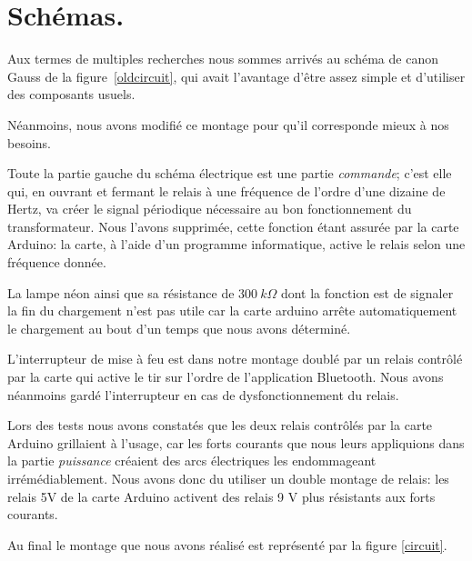\section{Schémas.}
Aux termes de multiples recherches nous sommes arrivés au
schéma de canon Gauss de la figure~\ref{oldcircuit}, qui avait l'avantage d'être assez
simple et d'utiliser des composants usuels.



Néanmoins, nous avons modifié ce montage pour qu'il corresponde
mieux à nos besoins.

Toute la partie gauche du schéma électrique est une partie
\emph{commande}; c'est elle qui, en ouvrant et fermant le
relais à une fréquence de l'ordre d'une dizaine de Hertz, va
créer le signal périodique nécessaire au bon fonctionnement du
transformateur. Nous l'avons supprimée, cette fonction étant
assurée par la carte Arduino: la carte, à l'aide d'un
programme informatique, active le relais selon une fréquence
donnée.

La lampe néon ainsi que sa résistance de $300\ k\Omega$ dont la
fonction est de signaler la fin du chargement n'est pas utile
car la carte arduino arrête automatiquement le chargement au
bout d'un temps que nous avons déterminé.

L'interrupteur de mise à feu est dans notre montage doublé par
un relais contrôlé par la carte qui active le tir sur l'ordre
de l'application Bluetooth. Nous avons néanmoins gardé
l'interrupteur en cas de dysfonctionnement du relais.

Lors des tests nous avons constatés que les deux relais
contrôlés par la carte Arduino grillaient à l'usage, car les
forts courants que nous leurs appliquions dans la partie
\emph{puissance} créaient des arcs électriques les endommageant
irrémédiablement. Nous avons donc du utiliser un double montage
de relais: les relais 5V de la carte Arduino activent des
relais 9 V plus résistants aux forts courants.

Au final le montage que nous avons réalisé est représenté par la figure \ref{circuit}.



